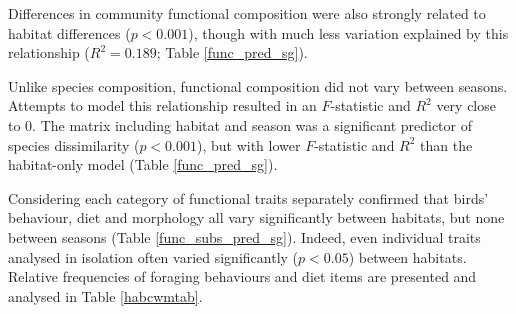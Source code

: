 \documentclass[12pt,a4paper]{article}\usepackage[]{graphicx}\usepackage[]{color}
\begin{document}
Differences in community functional composition were also strongly related to habitat differences ($p < 0.001$), though with much less variation explained by this relationship ($R^2 = 0.189$; Table \ref{func_pred_sg}). 

Unlike species composition, functional composition did not vary between seasons. Attempts to model this relationship resulted in an $F$-statistic and $R^2$ very close to $0$. The matrix including habitat and season was a significant predictor of species dissimilarity ($p < 0.001$), but with lower $F$-statistic and $R^2$ than the habitat-only model (Table \ref{func_pred_sg}).

Considering each category of functional traits separately confirmed that birds' behaviour, diet and morphology all vary significantly between habitats, but none between seasons (Table \ref{func_subs_pred_sg}). Indeed, even individual traits analysed in isolation often varied significantly ($p < 0.05$) between habitats. Relative frequencies of foraging behaviours and diet items are presented and analysed in Table \ref{habcwmtab}.
\end{document}
